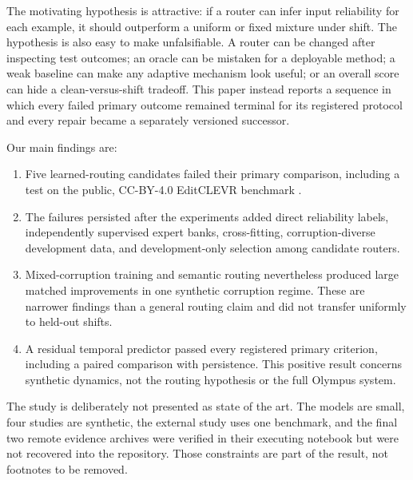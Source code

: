 \documentclass[10pt]{article}
\begin{document}
The motivating hypothesis is attractive: if a router can infer input reliability for each
example, it should outperform a uniform or fixed mixture under shift. The hypothesis is
also easy to make unfalsifiable. A router can be changed after inspecting test outcomes;
an oracle can be mistaken for a deployable method; a weak baseline can make any adaptive
mechanism look useful; or an overall score can hide a clean-versus-shift tradeoff. This
paper instead reports a sequence in which every failed primary outcome remained terminal
for its registered protocol and every repair became a separately versioned successor.

Our main findings are:
\begin{enumerate}
  \item Five learned-routing candidates failed their primary comparison, including a test
  on the public, CC-BY-4.0 EditCLEVR benchmark \cite{karnam2026editclevr}.
  \item The failures persisted after the experiments added direct reliability labels,
  independently supervised expert banks, cross-fitting, corruption-diverse development
  data, and development-only selection among candidate routers.
  \item Mixed-corruption training and semantic routing nevertheless produced large matched
  improvements in one synthetic corruption regime. These are narrower findings than a
  general routing claim and did not transfer uniformly to held-out shifts.
  \item A residual temporal predictor passed every registered primary criterion, including
  a paired comparison with persistence. This positive result concerns synthetic dynamics,
  not the routing hypothesis or the full Olympus system.
\end{enumerate}

The study is deliberately not presented as state of the art. The models are small, four
studies are synthetic, the external study uses one benchmark, and the final two remote
evidence archives were verified in their executing notebook but were not recovered into
the repository. Those constraints are part of the result, not footnotes to be removed.
\end{document}
